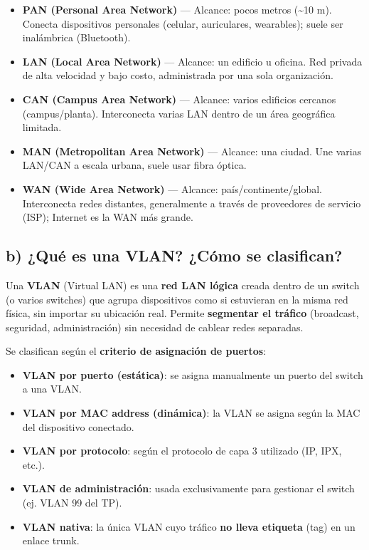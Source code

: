 \documentclass[12pt,a4paper]{article}
\begin{document}
\begin{itemize}
    \item \textbf{PAN (Personal Area Network)} — Alcance: pocos metros (\textasciitilde 10 m). Conecta dispositivos personales (celular, auriculares, wearables); suele ser inalámbrica (Bluetooth).
    \item \textbf{LAN (Local Area Network)} — Alcance: un edificio u oficina. Red privada de alta velocidad y bajo costo, administrada por una sola organización.
    \item \textbf{CAN (Campus Area Network)} — Alcance: varios edificios cercanos (campus/planta). Interconecta varias LAN dentro de un área geográfica limitada.
    \item \textbf{MAN (Metropolitan Area Network)} — Alcance: una ciudad. Une varias LAN/CAN a escala urbana, suele usar fibra óptica.
    \item \textbf{WAN (Wide Area Network)} — Alcance: país/continente/global. Interconecta redes distantes, generalmente a través de proveedores de servicio (ISP); Internet es la WAN más grande.
\end{itemize}

\subsection{b) ¿Qué es una VLAN? ¿Cómo se clasifican?}

Una \textbf{VLAN} (Virtual LAN) es una \textbf{red LAN lógica} creada dentro de un switch (o varios switches) que agrupa dispositivos como si estuvieran en la misma red física, sin importar su ubicación real. Permite \textbf{segmentar el tráfico} (broadcast, seguridad, administración) sin necesidad de cablear redes separadas.

Se clasifican según el \textbf{criterio de asignación de puertos}:

\begin{itemize}
    \item \textbf{VLAN por puerto (estática)}: se asigna manualmente un puerto del switch a una VLAN.
    \item \textbf{VLAN por MAC address (dinámica)}: la VLAN se asigna según la MAC del dispositivo conectado.
    \item \textbf{VLAN por protocolo}: según el protocolo de capa 3 utilizado (IP, IPX, etc.).
    \item \textbf{VLAN de administración}: usada exclusivamente para gestionar el switch (ej. VLAN 99 del TP).
    \item \textbf{VLAN nativa}: la única VLAN cuyo tráfico \textbf{no lleva etiqueta} (tag) en un enlace trunk.
\end{itemize}
\end{document}

